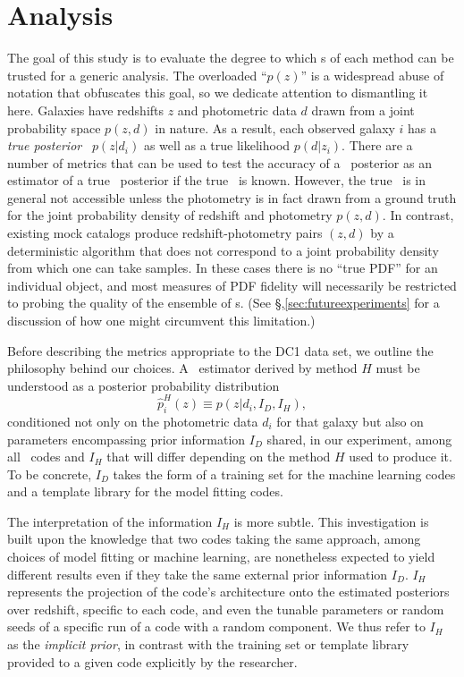 \section{Analysis}
\label{sec:metrics}

The goal of this study is to evaluate the degree to which \pzpdf s of each method can be trusted for a generic analysis.
The overloaded ``$p(z)$'' is a widespread abuse of notation that obfuscates this goal, so we dedicate attention to dismantling it here.
Galaxies have redshifts $z$ and photometric data $d$ drawn from a joint probability space $p(z, d)$ in nature.
As a result, each observed galaxy $i$ has a \textit{true posterior \pzpdf}\ $p(z \vert d_{i})$ as well as a true likelihood $p(d \vert z_{i})$.
There are a number of metrics that can be used to test the accuracy of a \pz\ posterior as an estimator of a true \pz\ posterior if the true \pzpdf\ is known.
However, the true \pzpdf\ is in general not accessible unless the photometry is in fact drawn from a ground truth for the joint probability density of redshift and photometry $p(z, d)$.
In contrast, existing mock catalogs produce redshift-photometry pairs $(z, d)$ by a deterministic algorithm that does not correspond to a joint probability density from which one can take samples.
In these cases there is no ``true PDF'' for an individual object, and most measures of PDF fidelity will necessarily be restricted to probing the quality of the ensemble of \pzpdf s.
(See \S,\ref{sec:futureexperiments} for a discussion of how one might circumvent this limitation.)

Before describing the metrics appropriate to the DC1 data set, we outline the philosophy behind our choices.
A \pzpdf\ estimator derived by method $H$ must be understood as a posterior probability distribution
\begin{equation}
  \label{eq:pzpdf}
\hat{p}^{H}_{i}(z) \equiv p(z \vert d_{i}, I_{D}, I_{H}),
\end{equation}
conditioned not only on the photometric data $d_{i}$ for that galaxy but also on parameters encompassing prior information $I_{D}$ shared, in our experiment, among all \pzpdf\ codes and $I_{H}$ that will differ depending on the method $H$ used to produce it.
To be concrete, $I_{D}$ takes the form of a training set for the machine learning codes and a template library for the model fitting codes. 

The interpretation of the information $I_{H}$ is more subtle.
This investigation is built upon the knowledge that two codes taking the same approach, among choices of model fitting or machine learning, are nonetheless expected to yield different results even if they take the same external prior information $I_{D}$.
$I_{H}$ represents the projection of the code's architecture onto the estimated posteriors over redshift, specific to each code, and even the tunable parameters or random seeds of a specific run of a code with a random component.
We thus refer to $I_{H}$ as the \textit{implicit prior}, in contrast with the training set or template library provided to a given code explicitly by the researcher.

